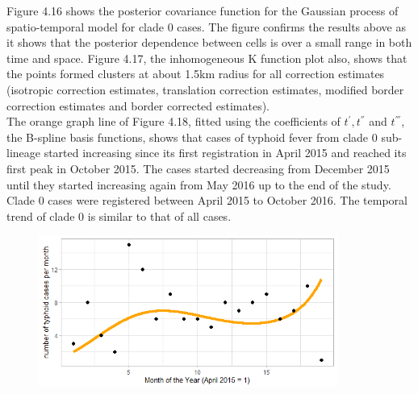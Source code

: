 \documentclass[12pt,a4paper]{report}
\begin{document}
Figure 4.16 shows the posterior covariance function for the Gaussian process of spatio-temporal model for clade 0 cases. The figure confirms the results above as it shows that the posterior dependence between cells is over a small range in both time and space. Figure 4.17, the inhomogeneous K function plot also, shows that the points formed clusters at about 1.5km radius for all correction estimates (isotropic correction estimates, translation correction estimates, modified border correction estimates and border corrected estimates).\\

The orange graph line of Figure 4.18, fitted using the coefficients of $t^{'}, t^{''}$ and $t^{'''}$, the B-spline basis functions, shows that cases of typhoid fever from clade 0 sub-lineage started increasing since its first registration in April 2015 and reached its first peak in October 2015. The cases started decreasing from December 2015 until they started increasing again from May 2016 up to the end of the study. Clade 0 cases were registered between April 2015 to October 2016. The temporal trend of clade 0 is similar to that of all cases.\\

\begin{figure}[H]
	\begin{center}
		\includegraphics[width = \linewidth, height = 50mm]{Long term trend of temporal model - Major 0.png}
	\end{center}
\end{figure}
\end{document}
